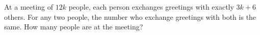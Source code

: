 At a meeting of $12k$ people, each person exchanges greetings with exactly $3k + 6$ others. For any two people, the number who exchange greetings with both is the same. How many people are at the meeting?
